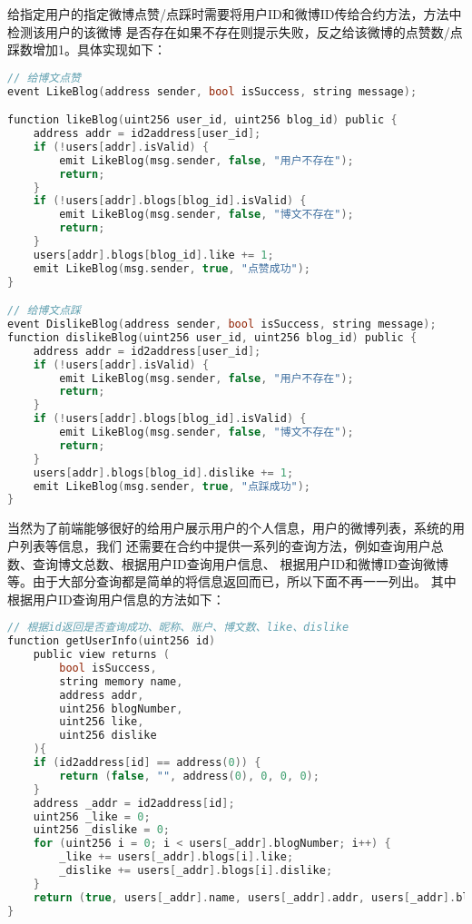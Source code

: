\documentclass[bwprint]{hfutreport}
\begin{document}
给指定用户的指定微博点赞/点踩时需要将用户ID和微博ID传给合约方法，方法中检测该用户的该微博
是否存在如果不存在则提示失败，反之给该微博的点赞数/点踩数增加1。具体实现如下：
\begin{lstlisting}[language=c]
// 给博文点赞
event LikeBlog(address sender, bool isSuccess, string message);

function likeBlog(uint256 user_id, uint256 blog_id) public {
    address addr = id2address[user_id];
    if (!users[addr].isValid) {
        emit LikeBlog(msg.sender, false, "用户不存在");
        return;
    }
    if (!users[addr].blogs[blog_id].isValid) {
        emit LikeBlog(msg.sender, false, "博文不存在");
        return;
    }
    users[addr].blogs[blog_id].like += 1;
    emit LikeBlog(msg.sender, true, "点赞成功");
}

// 给博文点踩
event DislikeBlog(address sender, bool isSuccess, string message);
function dislikeBlog(uint256 user_id, uint256 blog_id) public {
    address addr = id2address[user_id];
    if (!users[addr].isValid) {
        emit LikeBlog(msg.sender, false, "用户不存在");
        return;
    }
    if (!users[addr].blogs[blog_id].isValid) {
        emit LikeBlog(msg.sender, false, "博文不存在");
        return;
    }
    users[addr].blogs[blog_id].dislike += 1;
    emit LikeBlog(msg.sender, true, "点踩成功");
}
\end{lstlisting}

当然为了前端能够很好的给用户展示用户的个人信息，用户的微博列表，系统的用户列表等信息，我们
还需要在合约中提供一系列的查询方法，例如查询用户总数、查询博文总数、根据用户ID查询用户信息、
根据用户ID和微博ID查询微博等。由于大部分查询都是简单的将信息返回而已，所以下面不再一一列出。
其中根据用户ID查询用户信息的方法如下：
\begin{lstlisting}[language=c]
// 根据id返回是否查询成功、昵称、账户、博文数、like、dislike
function getUserInfo(uint256 id)
    public view returns (
        bool isSuccess,
        string memory name,
        address addr,
        uint256 blogNumber,
        uint256 like,
        uint256 dislike
    ){
    if (id2address[id] == address(0)) {
        return (false, "", address(0), 0, 0, 0);
    }
    address _addr = id2address[id];
    uint256 _like = 0;
    uint256 _dislike = 0;
    for (uint256 i = 0; i < users[_addr].blogNumber; i++) {
        _like += users[_addr].blogs[i].like;
        _dislike += users[_addr].blogs[i].dislike;
    }
    return (true, users[_addr].name, users[_addr].addr, users[_addr].blogNumber, _like, _dislike);
}
\end{lstlisting}
\end{document}
